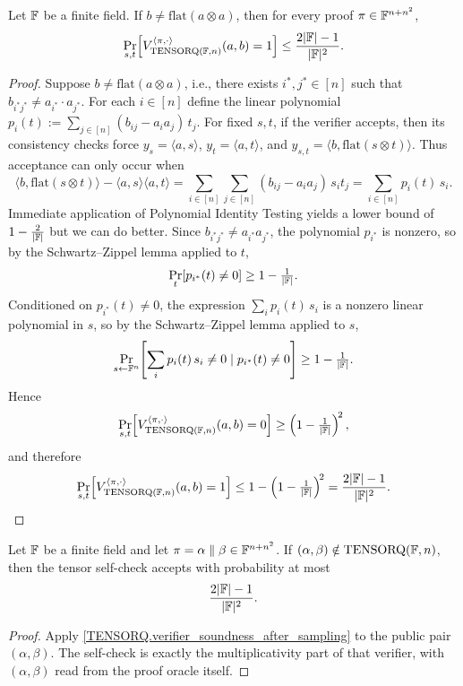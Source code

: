 \begin{lemma}\label{TENSORQ.verifier_soundness_after_sampling}\leanok
Let \(\mathbb{F}\) be a finite field. If \(b \neq \mathrm{flat}(a\otimes a)\), then for every proof
\(\pi\in \mathbb{F}^{n+n^2}\),
\[
  \Pr_{s,t}\!\left[
    V_{\mathrm{TENSORQ}(\mathbb{F},n)}^{\langle\pi,\cdot\rangle}(a,b)=1
  \right]
  \leq \frac{2|\mathbb{F}|-1}{|\mathbb{F}|^2}.
\]
\end{lemma}
\begin{proof}\leanok
Suppose \(b \neq \mathrm{flat}(a \otimes a)\), i.e., there exists \(i^*, j^* \in [n]\) such that
\(b_{i^* j^*} \neq a_{i^*} \cdot a_{j^*}\).
For each \(i \in [n]\) define the linear polynomial \(p_i(t) := \sum_{j \in [n]} (b_{ij} - a_i a_j)\, t_j\).
For fixed \(s,t\), if the verifier accepts, then its consistency checks force
\(y_s=\langle a,s\rangle\), \(y_t=\langle a,t\rangle\), and
\(y_{s,t}=\langle b,\mathrm{flat}(s\otimes t)\rangle\). Thus acceptance can only occur when
\[
  \langle b, \mathrm{flat}(s \otimes t) \rangle - \langle a,s\rangle\langle a,t\rangle
  = \sum_{i \in [n]}  \sum_{j \in [n]} (b_{ij} - a_i a_j)\, s_i t_j
  = \sum_{i \in [n]} p_i(t)\, s_i.
\]
Immediate application of Polynomial Identity Testing yields a lower bound of $1 - \tfrac{2}{|\mathbb{F}|}$ but we can do better.
Since \(b_{i^* j^*} \neq a_{i^*} a_{j^*}\), the polynomial \(p_{i^*}\) is nonzero, so by the
Schwartz--Zippel lemma applied to \(t\),
\[
  \Pr_{t}\!\left[p_{i^*}(t) \neq 0\right] \geq 1 - \tfrac{1}{|\mathbb{F}|}.
\]
Conditioned on \(p_{i^*}(t) \neq 0\), the expression \(\sum_i p_i(t)\,s_i\) is a nonzero linear polynomial
in \(s\), so by the Schwartz--Zippel lemma applied to \(s\),
\[
  \Pr_{s \leftarrow \mathbb{F}^n}\!\left[\sum_i p_i(t)\,s_i \neq 0 \mid p_{i^*}(t) \neq 0\right]
  \geq 1 - \tfrac{1}{|\mathbb{F}|}.
\]
Hence
\[
  \Pr_{s,t}\!\left[ V_{\mathrm{TENSORQ}(\mathbb{F},n)}^{\langle\pi,\cdot\rangle}(a,b)=0 \right]
  \geq \left(1 - \tfrac{1}{|\mathbb{F}|}\right)^{\!2},
\]
and therefore
\[
  \Pr_{s,t}\!\left[ V_{\mathrm{TENSORQ}(\mathbb{F},n)}^{\langle\pi,\cdot\rangle}(a,b)=1 \right]
  \leq 1 - \left(1 - \tfrac{1}{|\mathbb{F}|}\right)^{\!2}
  = \frac{2|\mathbb{F}|-1}{|\mathbb{F}|^2}.
\]
\end{proof}

\begin{lemma}\label{TENSORQ.selfVerifier_soundness_after_sampling}\leanok
Let \(\mathbb{F}\) be a finite field and let \(\pi=\alpha\parallel\beta\in\mathbb{F}^{n+n^2}\). If
\((\alpha,\beta)\notin\mathrm{TENSORQ}(\mathbb{F},n)\), then the tensor self-check accepts with probability at most
\[
  \frac{2|\mathbb{F}|-1}{|\mathbb{F}|^2}.
\]
\end{lemma}
\begin{proof}\leanok
Apply \ref{TENSORQ.verifier_soundness_after_sampling} to the public pair \((\alpha,\beta)\). The self-check is
exactly the multiplicativity part of that verifier, with \((\alpha,\beta)\) read from the proof oracle itself.
\end{proof}



